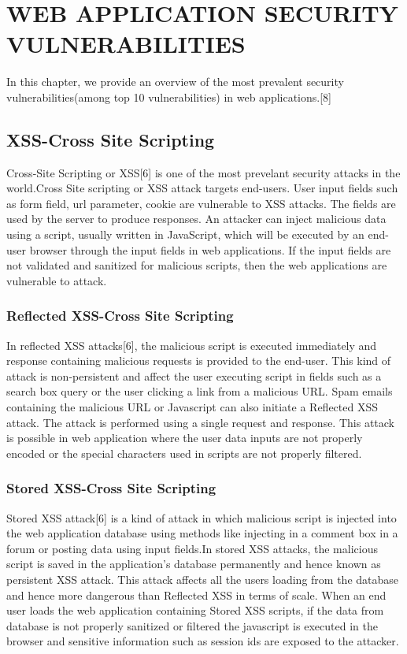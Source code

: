 
\chapter{WEB APPLICATION SECURITY VULNERABILITIES}

In this chapter, we provide an overview of the most prevalent security vulnerabilities(among top 10 vulnerabilities) in web applications.[8]

\section{XSS-Cross Site Scripting}
Cross-Site Scripting or XSS[6] is one of the most prevelant security attacks in the world.Cross Site scripting or XSS attack targets end-users. User input fields such as form field, url parameter, cookie are vulnerable to XSS attacks. The fields are  used by the server to produce responses. An attacker can inject malicious data using a script, usually written in JavaScript, which will be executed by an end-user browser through the input fields in web applications. If the input fields are not validated and sanitized for malicious scripts, then the web applications are vulnerable to attack.  

\subsection{Reflected XSS-Cross Site Scripting}
In reflected XSS attacks[6], the malicious script is executed immediately and response containing malicious requests is provided to the end-user. This kind of attack is non-persistent and affect the user executing script in fields such as a search box query or the user clicking a link from a malicious URL. Spam emails containing the malicious URL or Javascript can also initiate a Reflected XSS attack. The attack is performed using a single request and response. This attack is possible in web application where the user data inputs are not properly encoded or the special characters used in scripts are not properly filtered.

\subsection{Stored XSS-Cross Site Scripting}
Stored XSS attack[6] is a kind of attack in which malicious script is injected into the web application database using methods like injecting in a comment box in a forum or posting data using input fields.In stored XSS attacks, the malicious script is saved in the application's database permanently and hence known as persistent XSS attack. This attack affects all the users loading from the database and hence more dangerous than Reflected XSS in terms of scale. When an end user loads the web application containing Stored XSS scripts, if the data from database is not properly sanitized or filtered the javascript is executed in the browser and sensitive information such as session ids are exposed to the attacker.  


